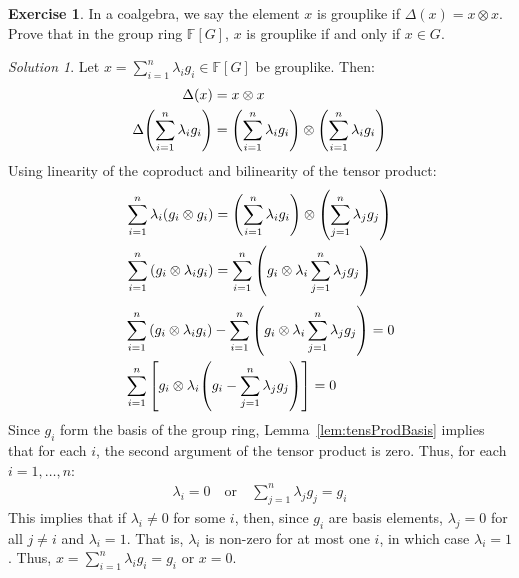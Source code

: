 \documentclass[svgnames]{article}
\theoremstyle{definition}
\newtheorem{Exercise}{Exercise}
\theoremstyle{remark}
\newtheorem*{Solution*}{Solution}
\theoremstyle{underline}
\theoremstyle{underline}
\begin{document}
	\begin{Exercise}
		In a coalgebra, we say the element $x$ is grouplike if $\Delta(x) = x \otimes x$. Prove that in the group ring $\mathbb F[G]$, $x$ is grouplike if and only if $x \in G$.
	\end{Exercise}
	\begin{Solution*}
		Let $x = \sum\limits_{i = 1}^n \lambda_i g_i \in \mathbb F[G]$ be grouplike. Then:
		\begin{align*}
		\Delta(x) & = x \otimes x \\
		\Delta\pqty{\sum_{i=1}^n \lambda_i g_i} & = \pqty{\sum_{i=1}^n \lambda_i g_i} \otimes \pqty{\sum_{i=1}^n \lambda_i g_i}
		\end{align*}
		Using linearity of the coproduct and bilinearity of the tensor product:
		\begin{align*}
		\sum_{i=1}^n \lambda_i \pqty{g_i \otimes g_i} & = \pqty{\sum_{i=1}^n \lambda_i g_i} \otimes \pqty{\sum_{j=1}^n \lambda_j g_j}\\
		\sum_{i=1}^n \pqty{g_i \otimes \lambda_i g_i} & = \sum_{i=1}^n \pqty{g_i \otimes \lambda_i \sum_{j=1}^n \lambda_j g_j}
		\end{align*}
		\begin{align*}
		& \sum_{i=1}^n  \pqty{ g_i \otimes \lambda_i g_i} - \sum_{i=1}^n  \pqty{ g_i \otimes \lambda_i \sum_{j=1}^n \lambda_j g_j} = 0 \\
		& \sum_{i=1}^n  \bqty{g_i \otimes \lambda_i\pqty{g_i - \sum_{j=1}^n \lambda_j g_j}} = 0
		\end{align*}
		Since $g_i$ form the basis of the group ring, Lemma~\ref{lem:tensProdBasis} implies that for each $i$, the second argument of the tensor product is zero. Thus, for each $i = 1, \ldots, n$:
		\begin{gather*}
		\lambda_i = 0 \quad \text{or} \quad \sum_{j=1}^n \lambda_j g_j = g_i
		\end{gather*}
		This implies that if $\lambda_i \ne 0$ for some $i$, then, since $g_i$ are basis elements, $\lambda_j = 0$ for all $j \ne i$ and $\lambda_i = 1$. That is, $\lambda_i$ is non-zero for at most one $i$, in which case $\lambda_i = 1$. Thus, $x = \sum\limits_{i = 1}^n \lambda_i g_i = g_i$ or $x = 0$.
	\end{Solution*}
	
\end{document}
